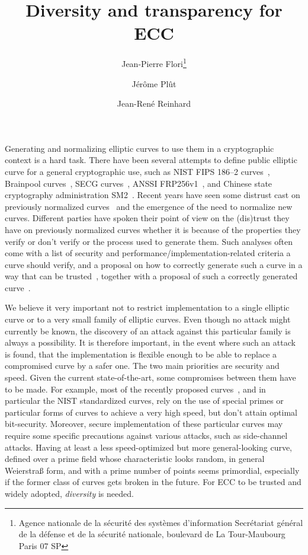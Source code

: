 \documentclass[twocolumn,letterpaper,10pt]{article}
\title{Diversity and transparency for ECC}
\author{Jean-Pierre Flori\thanks{Agence nationale de la sécurité des systèmes d'information\newline%
Secrétariat général de la défense et de la sécurité nationale\newline%
51, boulevard de La Tour-Maubourg\newline%
75700 Paris 07 SP}%
\and Jérôme Plût\footnotemark[1] \and Jean-René Reinhard\footnotemark[1]}
\date{}
\begin{document}
\sloppy \maketitle
Generating and normalizing elliptic curves to use them in a cryptographic
context is a hard task.
There have been several attempts to define public elliptic curve
for a general cryptographic use,
such as NIST FIPS 186--2 curves~\cite{nist2000fips186-2},
Brainpool curves~\cite{rfc5639},
SECG curves~\cite{certicom2010sec2},
ANSSI FRP256v1~\cite{jorf2011ce},
and Chinese state cryptography administration SM2~\cite{oscca2010sm2}.
Recent years have seen some distrust cast on previously normalized
curves~\cite{rfc5639,nist2000fips186-2,jorf2011ce,oscca2010sm2}
and the emergence of the need to normalize new curves.
Different parties have spoken their point of view on the (dis)trust they have
on previously normalized curves whether it is because of
the properties they verify or don't verify
or the process used to generate them.
Such analyses often come with
a list of security and performance/implementation-related criteria
a curve should verify,
and a proposal on how to correctly generate such a curve in a way that can be
trusted~\cite{safecurves,msr2014bcln,brainpool2005,eprint2014brainpool,eprint2013abgr},
together with a proposal of such a correctly generated
curve~\cite{pkc2006bernstein,msr2014bcln,eprint2013abgr}.

\medskip
We believe it very important not to restrict implementation
to a single elliptic curve or to a very small family of elliptic curves.
Even though no attack might currently be known,
the discovery of an attack against this particular family
is always a possibility.
It is therefore important, in the event where such an attack is found,
that the implementation is flexible enough to be able to
replace a compromised curve by a safer one.
The two main priorities are security and speed.
Given the current state-of-the-art,
some compromises between them have to be made.
For example, most of the recently proposed
curves~\cite{pkc2006bernstein,msr2014bcln,eprint2013abgr,oscca2010sm2},
and in particular the NIST standardized curves,
rely on the use of special primes or particular forms of curves to
achieve a very high speed,
but don't attain optimal bit-security.
Moreover, secure implementation of these particular curves
may require some specific precautions against various attacks,
such as side-channel attacks.
Having at least a less speed-optimized but more general-looking curve,
defined over a prime field whose characteristic looks random,
in general Weierstraß form, and with a prime number of points
seems primordial,
especially if the former class of curves gets broken in the future.
For ECC to be trusted and widely adopted, \emph{diversity} is needed.
\end{document}
